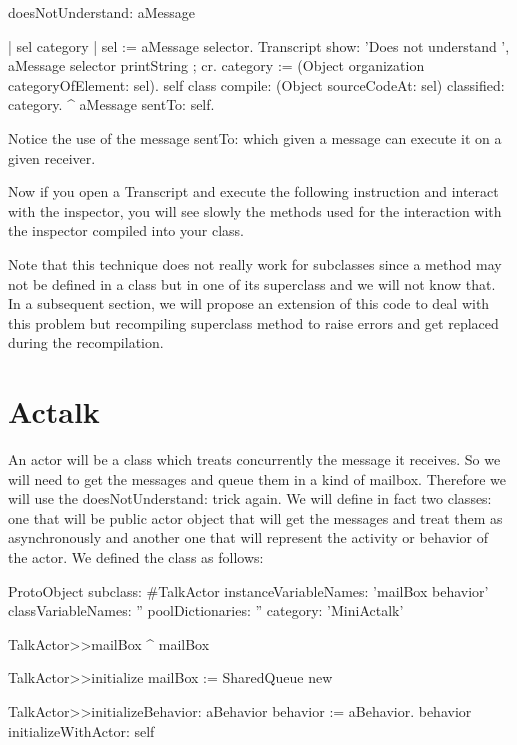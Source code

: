 \documentclass[a4paper,10pt,twoside]{book}
\begin{document}
\begin{code}{}
doesNotUnderstand: aMessage

	| sel category |
	sel := aMessage selector. 
	Transcript show: 'Does not understand ',  aMessage selector printString ; cr.
	category := (Object organization categoryOfElement: sel).
	self class compile: (Object sourceCodeAt: sel) classified: category.
	^ aMessage sentTo: self.
\end{code}


Notice the use of the message sentTo: which given a message can execute it on a given receiver. 

Now if you open a Transcript and execute the following instruction 
and interact with the inspector, you will see slowly the methods used for the interaction with the inspector
compiled into your class. 

Note that this technique does not really work for subclasses since a method may not be defined in a class
but in one of its superclass and we will not know that.
In a subsequent section, we will propose an extension of this code to deal with this problem but recompiling superclass method to raise
errors and get replaced during the recompilation.


\section{}


\section{Actalk}


An actor will be a class which treats concurrently the message it receives. So we will need to get the messages and queue them in a kind of mailbox. Therefore we will use the doesNotUnderstand: trick again. We will define in fact two classes: one that will be public actor object that will get the messages and treat them as asynchronously and another one that will represent the activity or behavior of the actor.
 We defined the class  as follows:



\begin{classdef}{}
ProtoObject subclass: #TalkActor
	instanceVariableNames: 'mailBox behavior'
	classVariableNames: ''
	poolDictionaries: ''
	category: 'MiniActalk'
\end{classdef}

\begin{method}{}
TalkActor>>mailBox
	^ mailBox
	
TalkActor>>initialize
	mailBox := SharedQueue new
	
TalkActor>>initializeBehavior: aBehavior
	behavior := aBehavior.
	behavior initializeWithActor: self
\end{method}
\end{document}
